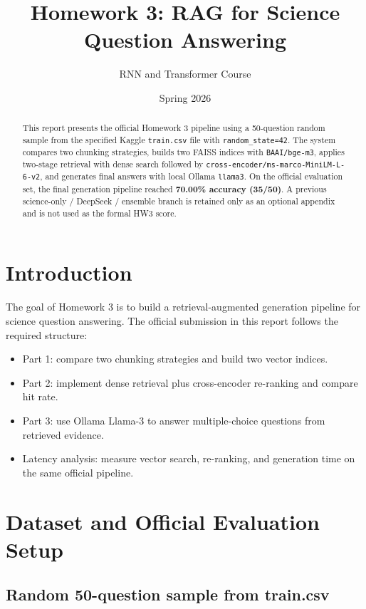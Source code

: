 \documentclass[12pt,a4paper]{article}
\title{Homework 3: RAG for Science Question Answering}
\author{RNN and Transformer Course}
\date{Spring 2026}
\begin{document}
\maketitle

\begin{abstract}
This report presents the official Homework 3 pipeline using a 50-question random sample from the specified Kaggle \texttt{train.csv} file with \texttt{random\_state=42}. The system compares two chunking strategies, builds two FAISS indices with \texttt{BAAI/bge-m3}, applies two-stage retrieval with dense search followed by \texttt{cross-encoder/ms-marco-MiniLM-L-6-v2}, and generates final answers with local Ollama \texttt{llama3}. On the official evaluation set, the final generation pipeline reached \textbf{70.00\% accuracy (35/50)}. A previous science-only / DeepSeek / ensemble branch is retained only as an optional appendix and is not used as the formal HW3 score.
\end{abstract}

\tableofcontents
\newpage

\section{Introduction}

The goal of Homework 3 is to build a retrieval-augmented generation pipeline for science question answering. The official submission in this report follows the required structure:

\begin{itemize}
    \item Part 1: compare two chunking strategies and build two vector indices.
    \item Part 2: implement dense retrieval plus cross-encoder re-ranking and compare hit rate.
    \item Part 3: use Ollama Llama-3 to answer multiple-choice questions from retrieved evidence.
    \item Latency analysis: measure vector search, re-ranking, and generation time on the same official pipeline.
\end{itemize}

\section{Dataset and Official Evaluation Setup}

\subsection{Random 50-question sample from train.csv}
\end{document}
